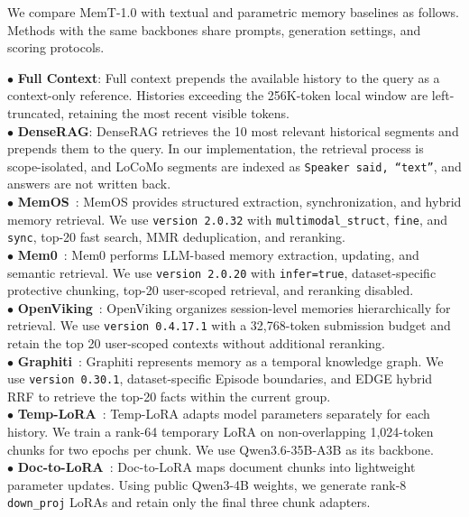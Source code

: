 We compare MemT-1.0 with textual and parametric memory baselines as follows.
Methods with the same backbones share prompts, generation settings, and scoring protocols.

$\bullet$ \textbf{Full Context}: Full context prepends the available history to the query as a context-only reference. Histories exceeding the 256K-token local window are left-truncated, retaining the most recent visible tokens. \\
$\bullet$ \textbf{DenseRAG}: DenseRAG retrieves the 10 most relevant historical segments and prepends them to the query.
In our implementation, the retrieval process is scope-isolated, and LoCoMo segments are indexed as \texttt{Speaker said, ``text''}, and answers are not written back. \\
$\bullet$ \textbf{MemOS}~\cite{li2025memos}: MemOS provides structured extraction, synchronization, and hybrid memory retrieval. We use \texttt{version 2.0.32} with \texttt{multimodal\_struct}, \texttt{fine}, and \texttt{sync}, top-20 fast search, MMR deduplication, and reranking. \\
$\bullet$ \textbf{Mem0}~\cite{chhikara2025mem0}: Mem0 performs LLM-based memory extraction, updating, and semantic retrieval. We use \texttt{version 2.0.20} with \texttt{infer=true}, dataset-specific protective chunking, top-20 user-scoped retrieval, and reranking disabled.\\
$\bullet$ \textbf{OpenViking}~\cite{fu2026vikingmem}: OpenViking organizes session-level memories hierarchically for retrieval.
We use \texttt{version 0.4.17.1} with a 32,768-token submission budget and retain the top 20 user-scoped contexts without additional reranking.\\
$\bullet$ \textbf{Graphiti}~\cite{rasmussen2025zep}: Graphiti represents memory as a temporal knowledge graph. We use \texttt{version 0.30.1}, dataset-specific Episode boundaries, and EDGE hybrid RRF to retrieve the top-20 facts within the current group. \\
$\bullet$ \textbf{Temp-LoRA}~\cite{wang2024greater}: Temp-LoRA adapts model parameters separately for each history.
We train a rank-64 temporary LoRA on non-overlapping 1,024-token chunks for two epochs per chunk.
We use Qwen3.6-35B-A3B as its backbone.\\
$\bullet$ \textbf{Doc-to-LoRA}~\cite{charakorn2026doc}: Doc-to-LoRA maps document chunks into lightweight parameter updates. Using public Qwen3-4B weights, we generate rank-8 \texttt{down\_proj} LoRAs and retain only the final three chunk adapters. \\
